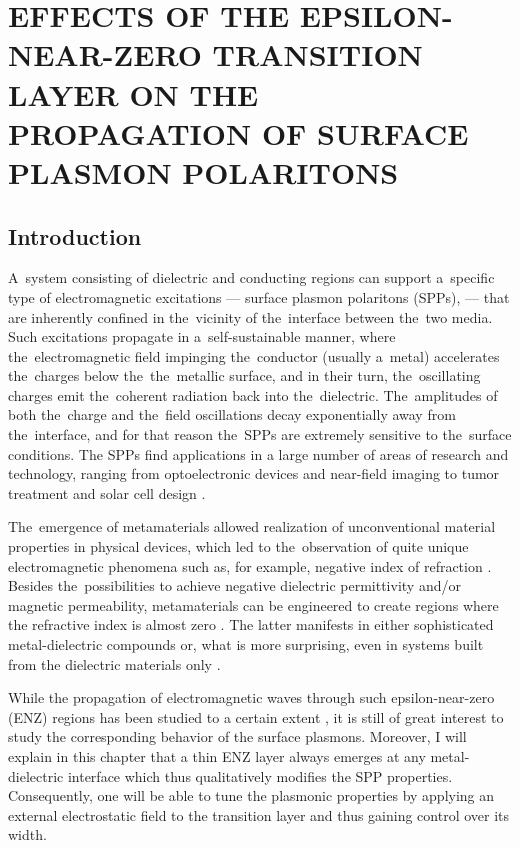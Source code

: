 \chapter{EFFECTS OF THE EPSILON-NEAR-ZERO TRANSITION LAYER ON THE PROPAGATION OF SURFACE PLASMON POLARITONS}


\section{Introduction}

A~system consisting of dielectric and conducting regions can support a~specific type of electromagnetic excitations --- surface plasmon polaritons (SPPs), --- that are inherently confined in the~vicinity of the~interface between the~two media.
Such excitations propagate in a~self-sustainable manner, where the~electromagnetic field impinging the~conductor (usually a~metal) accelerates the~charges below the~the~metallic surface, and in their turn, the~oscillating charges emit the~coherent radiation back into the~dielectric.
The~amplitudes of both the~charge and the~field oscillations decay exponentially away from the~interface, and for that reason the~SPPs are extremely sensitive to the~surface conditions.
The SPPs find applications in a large number of areas of research and technology, ranging from optoelectronic devices and near-field imaging to tumor treatment and solar cell design \cite{smallworld,notsosmall,schuller}.

The~emergence of metamaterials allowed realization of unconventional material properties in physical devices, which led to the~observation of quite unique electromagnetic phenomena such as, for example, negative index of refraction \cite{veselago,pendry,shalaev2}.
Besides the~possibilities to achieve negative dielectric permittivity and/or magnetic permeability, metamaterials can be engineered to create regions where the refractive index is almost zero \cite{schilling}.
The latter manifests in either sophisticated metal-dielectric compounds or, what is more surprising, even in systems built from the dielectric materials only \cite{moitra}.

While the propagation of electromagnetic waves through such epsilon-near-zero (ENZ) regions has been studied to a certain extent \cite{ginzburg}, it is still of great interest to study the corresponding behavior of the surface plasmons.
Moreover, I will explain in this chapter that a thin ENZ layer always emerges at any metal-dielectric interface which thus qualitatively modifies the SPP properties.
Consequently, one will be able to tune the plasmonic properties by applying an external electrostatic field to the transition layer and thus gaining control over its width.

